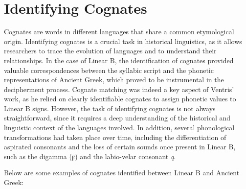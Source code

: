 \section{Identifying Cognates}
Cognates are words in different languages that share a common etymological origin.
Identifying cognates is a crucial task in historical linguistics, as it allows researchers to trace the evolution of languages and to understand their relationships.
In the case of Linear B, the identification of cognates provided valuable correspondences between the syllabic script and the phonetic representations of Ancient Greek, which proved to be instrumental in the decipherment process.
Cognate matching was indeed a key aspect of Ventris' work, as he relied on clearly identifiable cognates to assign phonetic values to Linear B signs.
However, the task of identifying cognates is not always straightforward, since it requires a deep understanding of the historical and linguistic context of the languages involved.
In addition, several phonological transformations had taken place over time, including the differentiation of aspirated consonants and the loss of certain sounds once present in Linear B, such as the digamma ({\textgreek{ϝ}}) and the labio-velar consonant \textit{q}.

Below are some examples of cognates identified between Linear B and Ancient Greek:  

